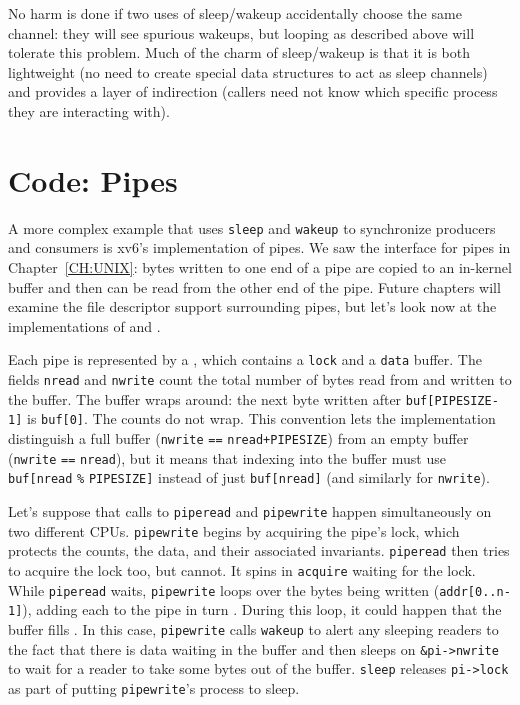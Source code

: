 No harm is done if two uses of sleep/wakeup accidentally
choose the same channel: they will see spurious wakeups,
but looping as described above will tolerate this problem.
Much of the charm of sleep/wakeup is that it is both
lightweight (no need to create special data
structures to act as sleep channels) and provides a layer
of indirection (callers need not know which specific process
they are interacting with).
\section{Code: Pipes}
A more complex example that uses \lstinline{sleep}
and \lstinline{wakeup} to synchronize producers and
consumers is xv6's implementation of pipes.
We saw the interface for pipes in Chapter~\ref{CH:UNIX}:
bytes written to one end of a pipe are copied
to an in-kernel buffer and then can be read from
the other end of the pipe.
Future chapters will examine the file descriptor support
surrounding pipes, but let's look now at the
implementations of 
and
.

Each pipe
is represented by a 
,
which contains
a 
\lstinline{lock}
and a 
\lstinline{data}
buffer.
The fields
\lstinline{nread}
and
\lstinline{nwrite}
count the total number of bytes read from
and written to the buffer.
The buffer wraps around:
the next byte written after
\lstinline{buf[PIPESIZE-1]}
is 
\lstinline{buf[0]}.
The counts do not wrap.
This convention lets the implementation
distinguish a full buffer 
(\lstinline{nwrite}
\lstinline{==}
\lstinline{nread+PIPESIZE})
from an empty buffer
(\lstinline{nwrite}
\lstinline{==}
\lstinline{nread}),
but it means that indexing into the buffer
must use
\lstinline{buf[nread}
\lstinline{%}
\lstinline{PIPESIZE]}
instead of just
\lstinline{buf[nread]} 
(and similarly for
\lstinline{nwrite}).

Let's suppose that calls to
\lstinline{piperead}
and
\lstinline{pipewrite}
happen simultaneously on two different CPUs.
\lstinline{pipewrite}
begins by acquiring the pipe's lock, which
protects the counts, the data, and their
associated invariants.
\lstinline{piperead}
then tries to acquire the lock too, but cannot.
It spins in
\lstinline{acquire}
waiting for the lock.
While
\lstinline{piperead}
waits,
\lstinline{pipewrite}
loops over the bytes being written
(\lstinline{addr[0..n-1]}),
adding each to the pipe in turn
.
During this loop, it could happen that
the buffer fills
.
In this case, 
\lstinline{pipewrite}
calls
\lstinline{wakeup}
to alert any sleeping readers to the fact
that there is data waiting in the buffer
and then sleeps on
\lstinline{&pi->nwrite}
to wait for a reader to take some bytes
out of the buffer.
\lstinline{sleep}
releases 
\lstinline{pi->lock}
as part of putting
\lstinline{pipewrite}'s
process to sleep.

